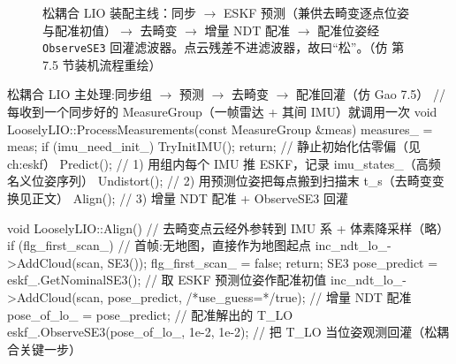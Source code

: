 \begin{figure}[ht]
\centering
{}
\caption{松耦合 LIO 装配主线：同步 $\to$ ESKF 预测（兼供去畸变逐点位姿与配准初值）$\to$ 去畸变 $\to$ 增量 NDT 配准 $\to$ 配准位姿经 \texttt{ObserveSE3} 回灌滤波器。点云残差不进滤波器，故曰“松”。（仿 \cite{gao2023slamad} 第 7.5 节装机流程重绘）}
\label{fig:lidar-loose-lio}
\end{figure}

\begin{codebox}[C++]{松耦合 LIO 主处理:同步组 $\to$ 预测 $\to$ 去畸变 $\to$ 配准回灌（仿 Gao 7.5）}
// 每收到一个同步好的 MeasureGroup（一帧雷达 + 其间 IMU）就调用一次
void LooselyLIO::ProcessMeasurements(const MeasureGroup &meas) {
  measures_ = meas;
  if (imu_need_init_) { TryInitIMU(); return; }  // 静止初始化估零偏（见 ch:eskf）
  Predict();      // 1) 用组内每个 IMU 推 ESKF，记录 imu_states_（高频名义位姿序列）
  Undistort();    // 2) 用预测位姿把每点搬到扫描末 t_s（去畸变变换见正文）
  Align();        // 3) 增量 NDT 配准 + ObserveSE3 回灌
}

void LooselyLIO::Align() {
  // 去畸变点云经外参转到 IMU 系 + 体素降采样（略）
  if (flg_first_scan_) {            // 首帧:无地图，直接作为地图起点
    inc_ndt_lo_->AddCloud(scan, SE3());  flg_first_scan_ = false;  return;
  }
  SE3 pose_predict = eskf_.GetNominalSE3();       // 取 ESKF 预测位姿作配准初值
  inc_ndt_lo_->AddCloud(scan, pose_predict, /*use_guess=*/true);   // 增量 NDT 配准
  pose_of_lo_ = pose_predict;                     // 配准解出的 T_LO
  eskf_.ObserveSE3(pose_of_lo_, 1e-2, 1e-2);      // 把 T_LO 当位姿观测回灌（松耦合关键一步）
}
\end{codebox}

